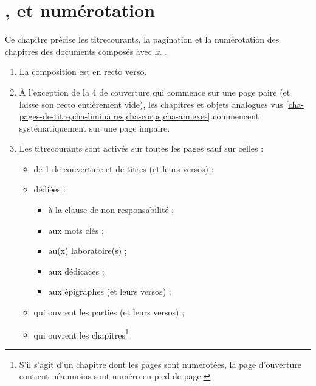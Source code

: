 \chapter{\texorpdfstring{}{Titres courants},  et numérotation}\label{cha-pagination}

Ce chapitre précise les \glspl{titrecourant}, la \gls{pagination} et la
numérotation des chapitres des documents composés avec la \yatcl{}.

\begin{enumerate}
\item La composition est en recto verso\exceptoneside.
\item À l'exception de la 4\ieme{} de couverture qui commence sur une page
  paire (et laisse son recto entièrement vide), les chapitres et objets
  analogues vus \vref{cha-pages-de-titre,cha-liminaires,cha-corps,cha-annexes}
  commencent systématiquement sur une page impaire\exceptoneside.
\item Les \glspl{titrecourant} sont activés sur toutes les pages sauf sur
  celles :
  \begin{itemize}
  \item de 1\iere{} de couverture et de titres (et leurs versos) ;
  \item dédiées :
    \begin{itemize}
    \item à la clause de non-responsabilité ;
    \item aux mots clés ;
    \item au(x) laboratoire(s) ;
    \item aux dédicaces ;
    \item aux épigraphes (et leurs versos) ;
    \end{itemize}
  \item qui ouvrent les parties (et leurs versos) ;
  \item qui ouvrent les chapitres\footnote{%
      S'il s'agit d'un chapitre dont les pages sont numérotées, la page
      d'ouverture contient néanmoins sont numéro en pied de page.%
}
\end{itemize}
\end{enumerate}
